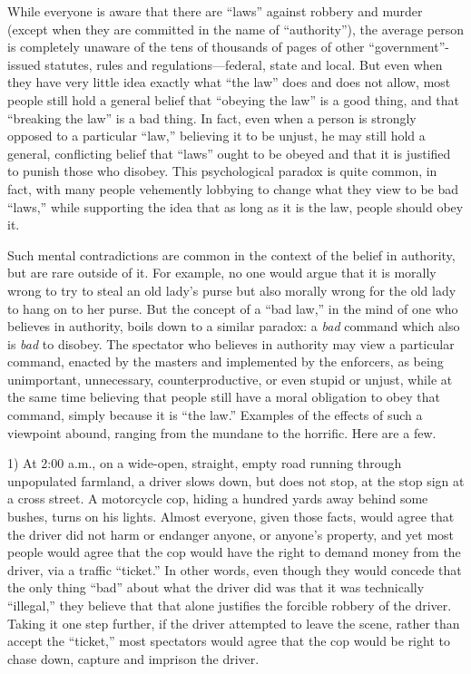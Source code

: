 \documentclass{book}
\begin{document}
While everyone is aware that there are \enquote{laws} against robbery and murder (except when they are committed in the name of \enquote{authority}), the average person is completely unaware of the tens of thousands of pages of other \enquote{government}-issued statutes, rules and regulations---federal, state and local. But even when they have very little idea exactly what \enquote{the law} does and does not allow, most people still hold a general belief that \enquote{obeying the law} is a good thing, and that \enquote{breaking the law} is a bad thing. In fact, even when a person is strongly opposed to a particular \enquote{law,} believing it to be unjust, he may still hold a general, conflicting belief that \enquote{laws} ought to be obeyed and that it is justified to punish those who disobey. This psychological paradox is quite common, in fact, with many people vehemently lobbying to change what they view to be bad \enquote{laws,} while supporting the idea that as long as it is the law, people should obey it.

Such mental contradictions are common in the context of the belief in authority, but are rare outside of it. For example, no one would argue that it is morally wrong to try to steal an old lady's purse but also morally wrong for the old lady to hang on to her purse. But the concept of a \enquote{bad law,} in the mind of one who believes in authority, boils down to a similar paradox: a \emph{bad} command which also is \emph{bad} to disobey. The spectator who believes in authority may view a particular command, enacted by the masters and implemented by the enforcers, as being unimportant, unnecessary, counterproductive, or even stupid or unjust, while at the same time believing that people still have a moral obligation to obey that command, simply because it is \enquote{the law.} Examples of the effects of such a viewpoint abound, ranging from the mundane to the horrific. Here are a few.

1) At 2:00 a.m., on a wide-open, straight, empty road running through unpopulated farmland, a driver slows down, but does not stop, at the stop sign at a cross street. A motorcycle cop, hiding a hundred yards away behind some bushes, turns on his lights. Almost everyone, given those facts, would agree that the driver did not harm or endanger anyone, or anyone's property, and yet most people would agree that the cop would have the right to demand money from the driver, via a traffic \enquote{ticket.} In other words, even though they would concede that the only thing \enquote{bad} about what the driver did was that it was technically \enquote{illegal,} they believe that that alone justifies the forcible robbery of the driver. Taking it one step further, if the driver attempted to leave the scene, rather than accept the \enquote{ticket,} most spectators would agree that the cop would be right to chase down, capture and imprison the driver.
\end{document}
